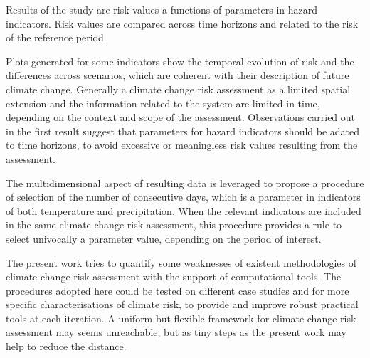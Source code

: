 Results of the study are risk values a functions of parameters in hazard indicators. Risk values are compared across time horizons and related to the risk of the reference period.

Plots generated for some indicators show the temporal evolution of risk and the differences across scenarios, which are coherent with their description of future climate change. Generally a climate change risk assessment as a limited spatial extension and the information related to the system are limited in time, depending on the context and scope of the assessment. Observations carried out in the first result suggest that parameters for hazard indicators should be adated to time horizons, to avoid excessive or meaningless risk values resulting from the assessment.

The multidimensional aspect of resulting data is leveraged to propose a procedure of selection of the number of consecutive days, which is a parameter in indicators of both temperature and precipitation. When the relevant indicators are included in the same climate change risk assessment, this procedure provides a rule to select univocally a parameter value, depending on the period of interest.

The present work tries to quantify some weaknesses of existent methodologies of climate change risk assessment with the support of computational tools. The procedures adopted here could be tested on different case studies and for more specific characterisations of climate risk, to provide and improve robust practical tools at each iteration.
A uniform but flexible framework for climate change risk assessment may seems unreachable, but as tiny steps as the present work may help to reduce the distance.
